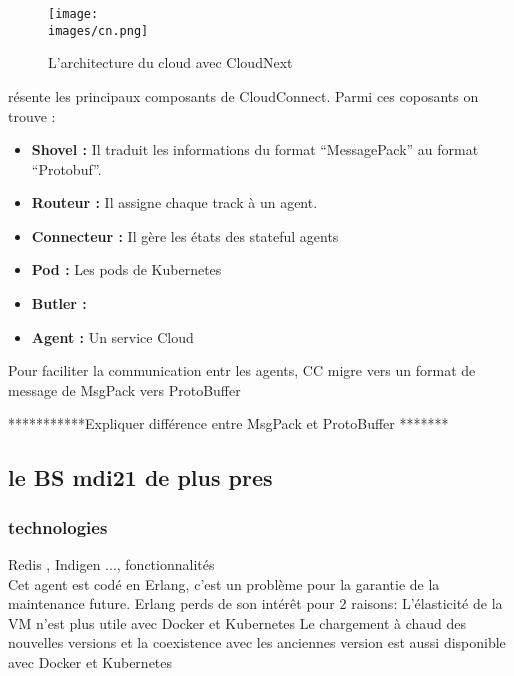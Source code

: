         \begin{figure}[h!]
            \centering
            \texttt{[image: \\images/cn.png]}
            \caption{L'architecture du cloud avec CloudNext}
        \end{figure}

        \vspace{0.2cm}

        résente les principaux composants de CloudConnect. 
        Parmi ces coposants on trouve : \\[0.3cm]
        \begin{itemize}
            \renewcommand{\labelitemi}{$\bullet$}
                \item \textbf{Shovel :} Il traduit les informations du format “MessagePack” au format “Protobuf”.
                \item \textbf{Routeur :} Il assigne chaque track à un agent.
                \item \textbf{Connecteur :} Il gère les états des stateful agents 
                \item \textbf{Pod :} Les pods de Kubernetes
                \item \textbf{Butler :}
                \item \textbf{Agent :} Un service Cloud
            \end{itemize} 

            Pour faciliter la communication entr les agents, \gls{CC} migre vers un format de message de MsgPack  vers ProtoBuffer 

***********Expliquer différence entre MsgPack et ProtoBuffer *******
        \break

    \subsection{le BS \gls{mdi21} de plus pres}

        \subsubsection{technologies}
        Redis , Indigen ..., fonctionnalités \\
        Cet agent est codé en Erlang, c’est un problème pour la garantie de la maintenance future.
        Erlang perds de son intérêt pour 2 raisons:
            L'élasticité de la VM n’est plus utile avec Docker et Kubernetes
            Le chargement à chaud des nouvelles versions et la coexistence avec les anciennes version est aussi 
            disponible avec Docker et Kubernetes


